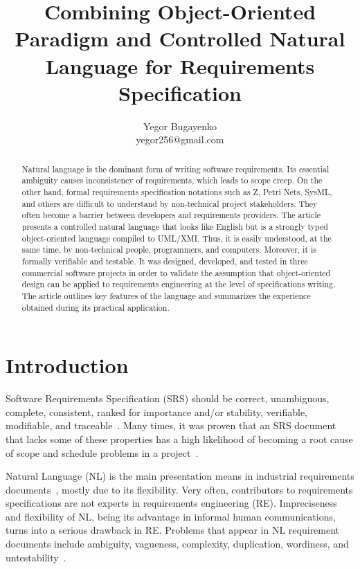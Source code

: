 \documentclass[conference]{IEEEtran}
\newcommand{\nospell}[1]{#1}
\begin{document}
\raggedbottom

\title{Combining Object-Oriented Paradigm and Controlled Natural Language for Requirements Specification}
\author{Yegor Bugayenko\\yegor256@gmail.com}
\maketitle

\begin{abstract} Natural language is the dominant form of writing software requirements.
Its essential ambiguity causes inconsistency of requirements,
which leads to scope creep. On the other hand, formal requirements
specification notations such as Z, \nospell{Petri Nets}, SysML, and others are
difficult to understand by non-technical project stakeholders. They often
become a barrier between developers and requirements providers. The article
presents a controlled natural language that looks like English but
is a strongly typed object-oriented language compiled to
UML/XMI. Thus, it is easily understood, at the same time, by non-technical
people, programmers, and computers. Moreover, it is formally verifiable and
testable. It was designed, developed, and tested in three commercial
software projects in order to validate the assumption that object-oriented
design can be applied to requirements engineering at the level of
specifications writing. The article outlines key features of the language and summarizes
the experience obtained during its practical application. \end{abstract}

\section{Introduction}
\label{sec:intro}

Software Requirements Specification (SRS) should be correct, unambiguous,
complete, consistent, ranked for importance and/or stability, verifiable,
modifiable, and traceable~\cite{ieee830}. Many times, it was proven that an SRS
document that lacks some of these properties has a high likelihood of
becoming a root cause of scope and schedule problems in a
project~\cite{wiegers03,ears09,chen09}.

Natural Language (NL) is the main presentation means in industrial
requirements documents~\cite{kof10,sinha10}, mostly due to its flexibility.
Very often, contributors to requirements specifications are not experts in
requirements engineering (RE). Impreciseness and flexibility of NL, being
its advantage in informal human communications, turns into a serious drawback
in RE. Problems that appear in NL requirement documents include
ambiguity, vagueness, complexity, duplication, wordiness, and
\nospell{untestability}~\cite{ears09}.
\end{document}
